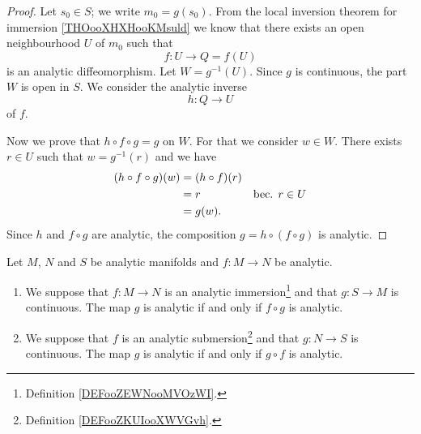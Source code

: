 \begin{proof}
	Let \( s_0\in S\); we write \( m_0=g(s_0)\). From the local inversion theorem for immersion \ref{THOooXHXHooKMsuld} we know that there exists an open neighbourhood \( U\) of \( m_0\) such that
	\begin{equation}
		f \colon U\to Q= f(U)
	\end{equation}
	is an analytic diffeomorphism. Let \( W=g^{-1}(U)\). Since \( g\) is continuous, the part \( W\) is open in \( S\). We consider the analytic inverse
	\begin{equation}
		h \colon Q\to U
	\end{equation}
	of \( f\).

	Now we prove that \( h\circ f\circ g=g\) on \( W\). For that we consider  \( w\in W\). There exists \( r\in U\) such that \( w=g^{-1}(r)\) and we have
	\begin{subequations}
		\begin{align}
			(h\circ f\circ g)(w) & =(h\circ f)(r)                           \\
			                     & =r             & \text{bec. \( r\in U\)} \\
			                     & =g(w).
		\end{align}
	\end{subequations}
	Since \( h\) and \( f\circ g\) are analytic, the composition \( g=h\circ(f\circ g)\) is analytic.
\end{proof}

\begin{proposition}       \label{PROPooKAXOooZCwcwi}
	Let \( M\), \( N\) and \( S\) be analytic manifolds and \( f\colon M\to N\) be analytic.
	\begin{enumerate}
		\item		\label{ITEMooUAUTooPbTjGk}
		      We suppose that \(f \colon M\to N  \) is an analytic immersion\footnote{Definition \ref{DEFooZEWNooMVOzWI}.} and that \( g\colon S\to M\) is continuous. The map \( g\) is analytic if and only if \( f\circ g\) is analytic.
		\item		\label{ITEMooINFHooFThbni}
		      We suppose that \( f\) is an analytic submersion\footnote{Definition \ref{DEFooZKUIooXWVGvh}.} and that \( g\colon N\to S\) is continuous. The map \( g\) is analytic if and only if \( g\circ f\) is analytic.
	\end{enumerate}
\end{proposition}

